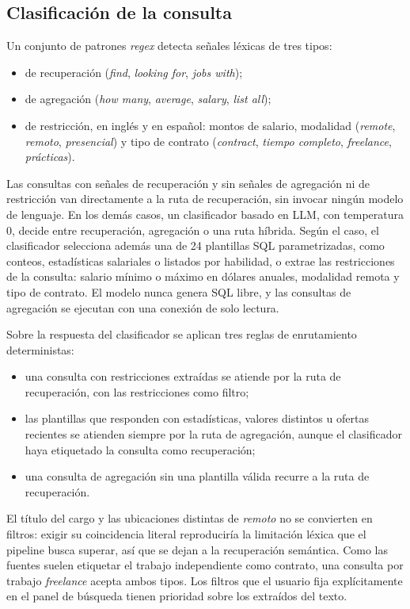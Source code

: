 \subsection{Clasificación de la consulta}
\label{sec:art-clasificacion}

Un conjunto de patrones \textit{regex} detecta señales léxicas de tres tipos:
\begin{itemize}
    \item de recuperación (\textit{find}, \textit{looking for}, \textit{jobs with});
    \item de agregación (\textit{how many}, \textit{average}, \textit{salary}, \textit{list all});
    \item de restricción, en inglés y en español: montos de salario, modalidad (\textit{remote}, \textit{remoto}, \textit{presencial}) y tipo de contrato (\textit{contract}, \textit{tiempo completo}, \textit{freelance}, \textit{prácticas}).
\end{itemize}
Las consultas con señales de recuperación y sin señales de agregación ni de restricción van directamente a la ruta de recuperación, sin invocar ningún modelo de lenguaje. En los demás casos, un clasificador basado en LLM, con temperatura 0, decide entre recuperación, agregación o una ruta híbrida. Según el caso, el clasificador selecciona además una de 24 plantillas SQL parametrizadas, como conteos, estadísticas salariales o listados por habilidad, o extrae las restricciones de la consulta: salario mínimo o máximo en dólares anuales, modalidad remota y tipo de contrato. El modelo nunca genera SQL libre, y las consultas de agregación se ejecutan con una conexión de solo lectura.

Sobre la respuesta del clasificador se aplican tres reglas de enrutamiento deterministas:
\begin{itemize}
    \item una consulta con restricciones extraídas se atiende por la ruta de recuperación, con las restricciones como filtro;
    \item las plantillas que responden con estadísticas, valores distintos u ofertas recientes se atienden siempre por la ruta de agregación, aunque el clasificador haya etiquetado la consulta como recuperación;
    \item una consulta de agregación sin una plantilla válida recurre a la ruta de recuperación.
\end{itemize}

El título del cargo y las ubicaciones distintas de \textit{remoto} no se convierten en filtros: exigir su coincidencia literal reproduciría la limitación léxica que el pipeline busca superar, así que se dejan a la recuperación semántica. Como las fuentes suelen etiquetar el trabajo independiente como contrato, una consulta por trabajo \textit{freelance} acepta ambos tipos. Los filtros que el usuario fija explícitamente en el panel de búsqueda tienen prioridad sobre los extraídos del texto.


